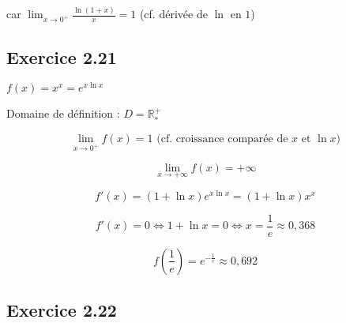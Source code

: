 \documentclass{report}
\begin{document}
car $\lim_{x \rightarrow 0^{+}} \frac{\ln(1+x)}{x} = 1$ (cf. dérivée de $\ln$ en $1$)

\subsection*{Exercice 2.21}

$f(x) = x^x = e^{x \ln x}$

Domaine de définition : $D = \mathbb{R}^+_*$

\begin{displaymath}
	\lim_{x \rightarrow 0^{+}} f(x) = 1  \text{ (cf. croissance comparée de $x$ et $\ln x$)}
\end{displaymath}

\begin{displaymath}
	\lim_{x \rightarrow +\infty} f(x) = +\infty
\end{displaymath}

\begin{displaymath}
	f'(x) = (1+ \ln x)e^{x \ln x} = (1+ \ln x)x^x
\end{displaymath}

\begin{displaymath}
	f'(x) = 0 \Longleftrightarrow 1 + \ln x = 0 \Longleftrightarrow x = \frac{1}{e} \approx 0,368
\end{displaymath}

\begin{displaymath}
	f\left(\frac{1}{e}\right) = e^{-\frac{1}{e}} \approx 0,692
\end{displaymath}



\subsection*{Exercice 2.22}
\end{document}
